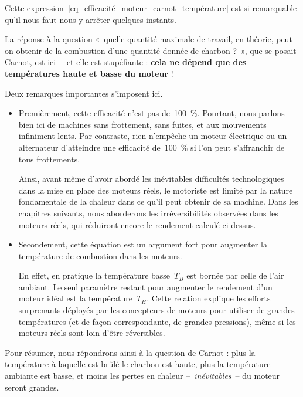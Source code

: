 		Cette expression~\ref{eq_efficacité_moteur_carnot_température} est si remarquable qu’il nous faut nous y arrêter quelques instants.

		La réponse à la question «~quelle quantité maximale de travail, en théorie, peut-on obtenir de la combustion d’une quantité donnée de charbon ?~», que se posait Carnot, est ici --\ et elle est stupéfiante : \textbf{cela ne dépend que des températures haute et basse du moteur} !

		Deux remarques importantes s’imposent ici.

		\begin{itemize}
			\item Premièrement, cette efficacité n’est pas de~\SI{100}{\percent}. Pourtant, nous parlons bien ici de machines sans frottement, sans fuites, et aux mouvements infiniment lents. Par contraste, rien n’empêche un moteur électrique ou un alternateur d’atteindre une efficacité de~\SI{100}{\percent} si l’on peut s’affranchir de tous frottements. 

			Ainsi, avant même d’avoir abordé les inévitables difficultés technologiques dans la mise en place des moteurs réels, le motoriste est limité par la nature fondamentale de la chaleur dans ce qu’il peut obtenir de sa machine. Dans les chapitres suivants, nous aborderons les irréversibilités observées dans les moteurs réels, qui réduiront encore le rendement calculé ci-dessus.

			\item Secondement, cette équation est un argument fort pour augmenter la température de combustion dans les moteurs.

			En effet, en pratique la température basse~$T_B$ est bornée par celle de l’air ambiant. Le seul paramètre restant pour augmenter le rendement d’un moteur idéal est la température~$T_H$. Cette relation explique les efforts surprenants déployés par les concepteurs de moteurs pour utiliser de grandes températures (et de façon correspondante, de grandes pressions), même si les moteurs réels sont loin d’être réversibles.

		\end{itemize}

		Pour résumer, nous répondrons ainsi à la question de Carnot : plus la température à laquelle est brûlé le charbon est haute, plus la température ambiante est basse, et moins les pertes en chaleur --\ \emph{inévitables}\ -- du moteur seront grandes.
		
